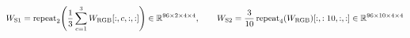 \documentclass[preview]{standalone}
\begin{document}
\begin{align*}
\special{dvisvgm:raw <g id='unique000'>}W_{\text{S1}} = \text{repeat}_2\!\left(\frac{1}{3}\sum_{c=1}^{3} W_{\text{RGB}}[:,c,:,:]\right) \in \mathbb{R}^{96\times 2\times 4\times 4}, \qquad W_{\text{S2}} = \frac{3}{10}\,\text{repeat}_4(W_{\text{RGB}})[:,:10,:,:] \in \mathbb{R}^{96\times 10\times 4\times 4}\special{dvisvgm:raw </g>}
\end{align*}
\end{document}
